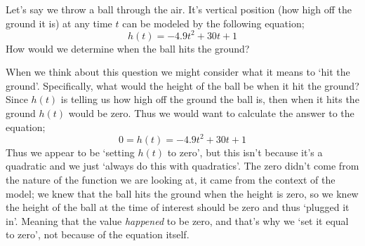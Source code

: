 \documentclass{ximeraXloud}
\begin{document}
    \begin{explanation}%
        Let's say we throw a ball through the air. It's vertical position (how high off the ground it is) at any time $t$ can be modeled by the following equation;
        \[
            h(t) = -4.9t^2 + 30t + 1
        \]
        How would we determine when the ball hits the ground?
    
        When we think about this question we might consider what it means to `hit the ground'. Specifically, what would the height of the ball be when it hit the ground? Since $h(t)$ is telling us how high off the ground the ball is, then when it hits the ground $h(t)$ would be zero. Thus we would want to calculate the answer to the equation;
        \[
            0 = h(t) = -4.9t^2 + 30t + 1
        \]
        Thus we appear to be `setting $h(t)$ to zero', but this isn't because it's a quadratic and we just `always do this with quadratics'. The zero didn't come from the nature of the function we are looking at, it came from the context of the model; we knew that the ball hits the ground when the height is zero, so we knew the height of the ball at the time of interest should be zero and thus `plugged it in'. Meaning that the value \textit{happened} to be zero, and that's why we `set it equal to zero', not because of the equation itself.
    \end{explanation}
\end{document}
